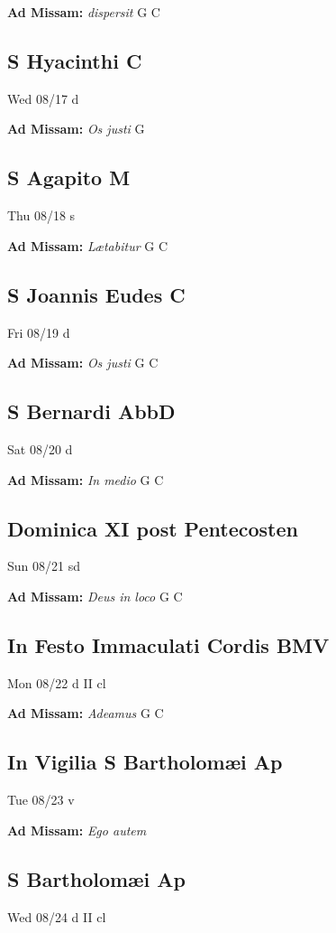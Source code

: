 \documentclass[letterpaper, 10pt, twocolumn]{article}
\begin{document}
\textbf{Ad Missam:} \textit{dispersit} G C 

\subsection*{S Hyacinthi C}Wed 08/17 d

\textbf{Ad Missam:} \textit{Os justi} G 

\subsection*{S Agapito M}Thu 08/18 s

\textbf{Ad Missam:} \textit{Lætabitur} G C 

\subsection*{S Joannis Eudes C}Fri 08/19 d

\textbf{Ad Missam:} \textit{Os justi} G C 

\subsection*{S Bernardi AbbD}Sat 08/20 d

\textbf{Ad Missam:} \textit{In medio} G C 

\subsection*{Dominica XI post Pentecosten}Sun 08/21 sd

\textbf{Ad Missam:} \textit{Deus in loco} G C 

\subsection*{In Festo Immaculati Cordis BMV}Mon 08/22 d II cl

\textbf{Ad Missam:} \textit{Adeamus} G C 

\subsection*{In Vigilia S Bartholomæi Ap}Tue 08/23 v

\textbf{Ad Missam:} \textit{Ego autem} 

\subsection*{S Bartholomæi Ap}Wed 08/24 d II cl
\end{document}
